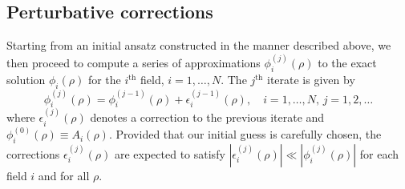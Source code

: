 \documentclass[final,3p,11pt,pdflatex]{elsarticle}
\begin{document}
\subsection{Perturbative corrections} \label{sec:perturbative_corrections}

Starting from an initial ansatz constructed in the manner described above,
we then proceed to compute a series of approximations $\phi_i^{(j)}(\rho)$ to
the exact solution $\phi_i(\rho)$ for the $i^{\text{th}}$ field, $i = 1, \ldots,
N$.  The $j^{\text{th}}$ iterate is given by
\begin{equation} \label{eq:nk-iterates}
  \phi_i^{(j)}(\rho) = \phi_i^{(j-1)}(\rho) + \epsilon_i^{(j-1)}(\rho) ,
  \quad i = 1, \ldots, N, \, j = 1, 2, \ldots
\end{equation}
where $\epsilon_i^{(j)}(\rho)$ denotes a correction to the previous iterate
and $\phi_i^{(0)}(\rho) \equiv A_i(\rho)$.  Provided that our initial guess is
carefully chosen, the corrections $\epsilon_i^{(j)}(\rho)$ are expected to
satisfy $|\epsilon_i^{(j)}(\rho)| \ll |\phi_i^{(j)}(\rho)|$ for each field $i$
and for all $\rho$.
\end{document}
